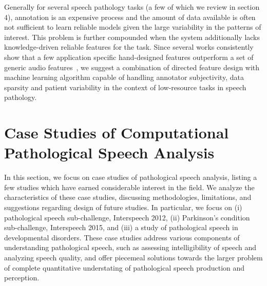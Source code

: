 \documentclass{article}
\begin{document}
Generally for several speech pathology tasks (a few of which we review in section 4), annotation is an expensive process and the amount of data available is often not sufficient to learn reliable models given the large variability in the patterns of interest. 
This problem is further compounded when the system additionally lacks knowledge-driven reliable features for the task. 
Since several works consistently show that a few application specific hand-designed features outperform a set of generic audio features~\cite{kim2013pathology}, we suggest a combination of directed feature design with machine learning algorithm capable of handling annotator subjectivity, data sparsity and patient variability in the context of low-resource tasks in speech pathology.



\section{Case Studies of Computational Pathological Speech Analysis}
In this section, we focus on case studies of pathological speech analysis, listing a few studies which have earned considerable interest in the field. We analyze the characteristics of these case studies, discussing methodologies, limitations, and suggestions regarding design of future studies.
In particular, we focus on (i) pathological speech sub-challenge, Interspeech 2012, (ii) Parkinson's condition sub-challenge, Interspeech 2015, and (iii) a study of pathological speech in developmental disorders. 
These case studies address various components of understanding pathological speech, such as assessing intelligibility of speech and analyzing speech quality, and offer piecemeal solutions towards the larger problem of complete quantitative understating of pathological speech production and perception.
\end{document}
